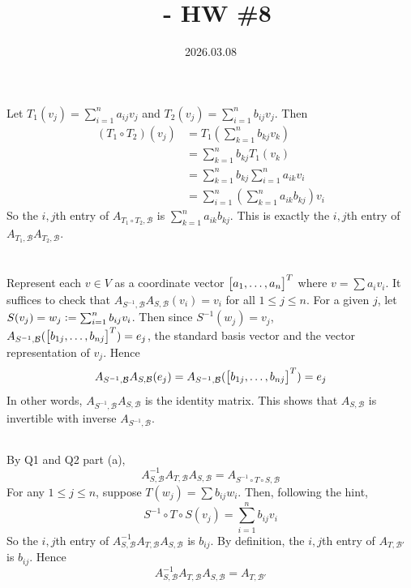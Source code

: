 \documentclass[12pt]{article}
\title{\course\ - HW \#8}
\author{\myname}
\date{2026.03.08}
\begin{document}
\maketitle
\thispagestyle{fancy}


\section{}
Let $T_1(v_j) = \sum_{i = 1}^{n} a_{ij} v_j$ and $T_2(v_j) = \sum_{i = 1}^{n} b_{ij} v_j$. 
Then  
\begin{align*}
  (T_1 \circ T_2)(v_j) & = T_1 (\sum_{k = 1}^n b_{kj} v_k) \\ 
                       & = \sum_{k = 1}^{n} b_{kj} T_1 (v_k) \\ 
                       & = \sum_{k = 1}^{n} b_{kj} \sum_{i = 1}^{n} a_{ik}v_i \\ 
                       & = \sum_{i = 1}^{n} \left( \sum_{k = 1}^{n} a_{ik} b_{kj} \right)v_i 
\end{align*}
So the $i, j$th entry of $A_{T_1 \circ T_2, \mathcal{B}}$ is $\sum_{k = 1}^{n} a_{ik} b_{kj}$. 
This is exactly the $i, j$th entry of $A_{T_1, \mathcal{B}} A_{T_2, \mathcal{B}}$. 

\section{}
\subsection{}
Represent each $v \in V$ as a coordinate vector $\begin{bmatrix}a_1, \ldots, a_n\end{bmatrix}^{T}$ where $v = \sum a_i v_i$. 
It suffices to check that $A_{S^{-1}, \mathcal{B}} A_{S, \mathcal{B}} (v_i) = v_i$ for all $1 \leq j \leq n$. 
For a given $j$, let $S(v_j) = w_j \vcentcolon= \sum_{i = 1}^{n} b_{ij} v_i$.
Then since $S^{-1}(w_j) = v_j$, $A_{S^{-1}, \mathcal{B}} (\begin{bmatrix}b_{1j}, \ldots, b_{nj}\end{bmatrix}^T) = e_j$, the standard basis vector and the vector representation of $v_j$. 
Hence 
$$A_{S^{-1}, \mathcal{B}} A_{S, \mathcal{B}} (e_j) = A_{S^{-1}, \mathcal{B}} (\begin{bmatrix}b_{1j}, \ldots, b_{nj}\end{bmatrix}^{T}) = e_j$$
In other words, $A_{S^{-1}, \mathcal{B}} A_{S, \mathcal{B}}$ is the identity matrix. 
This shows that $A_{S, \mathcal{B}}$ is invertible with inverse $A_{S^{-1}, \mathcal{B}}$. 

\subsection{} 
\newcommand{\PiAP}{A_{S, \mathcal{B}}^{-1} A_{T, \mathcal{B}} A_{S, \mathcal{B}}}
\newcommand{\Ap}{A_{T, \mathcal{B'}}} 
By Q1 and Q2 part (a), 
$$ \PiAP = A_{S^{-1} \circ T \circ S, \mathcal{B}}$$ 
For any $1 \leq j \leq n$, suppose $T(w_j) = \sum b_{ij} w_i$. 
Then, following the hint, 
$$S^{-1} \circ T \circ S(v_j) = \sum_{i = 1}^{n} b_{ij} v_i$$   
So the $i, j$th entry of $\PiAP$ is $b_{ij}$. 
By definition, the $i, j$th entry of $\Ap$ is $b_{ij}$. 
Hence 
$$\PiAP = \Ap$$ 
\end{document}
